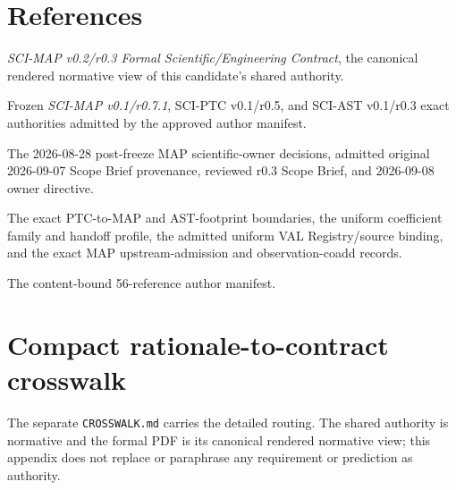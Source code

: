 \documentclass[10pt]{article}
\newcommand{\code}[1]{\nolinkurl{#1}}
\begin{document}
\section*{References}
\begin{enumerate}[label={[\arabic*]},leftmargin=*]
\item \emph{SCI-MAP v0.2/r0.3 Formal Scientific/Engineering Contract}, the canonical rendered normative view of this candidate's shared authority.
\item Frozen \emph{SCI-MAP v0.1/r0.7.1}, SCI-PTC v0.1/r0.5, and SCI-AST v0.1/r0.3 exact authorities admitted by the approved author manifest.
\item The 2026-08-28 post-freeze MAP scientific-owner decisions, admitted original 2026-09-07 Scope Brief provenance, reviewed r0.3 Scope Brief, and 2026-09-08 owner directive.
\item The exact PTC-to-MAP and AST-footprint boundaries, the uniform
coefficient family and handoff profile, the admitted uniform VAL
Registry/source binding, and the exact MAP upstream-admission and
observation-coadd records.
\item The content-bound 56-reference author manifest.
\end{enumerate}

\clearpage\appendix
\section{Compact rationale-to-contract crosswalk}\label{app:crosswalk}
The separate \code{CROSSWALK.md} carries the detailed routing. The shared
authority is normative and the formal PDF is its canonical rendered normative
view; this appendix does not replace or paraphrase any requirement or
prediction as authority.
\end{document}

